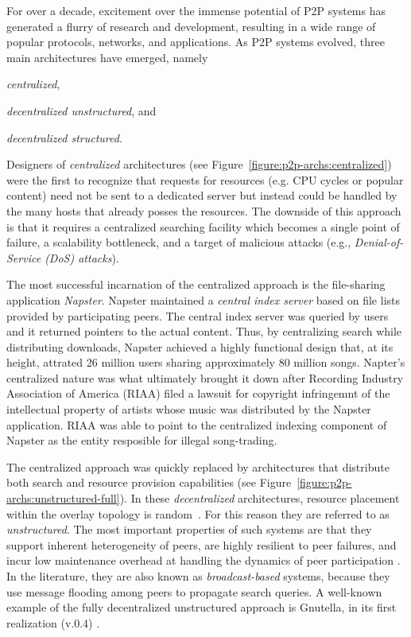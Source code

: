 For over a decade, excitement over the immense potential of P2P systems has
generated a flurry of research and development, resulting in a wide range of
popular protocols, networks, and applications. As P2P systems evolved, three
main architectures have emerged, namely
\begin{inparaenum}
  \item \emph{centralized},
  \item \emph{decentralized unstructured}, and
  \item \emph{decentralized structured}.
\end{inparaenum}

Designers of \emph{centralized} architectures (see
Figure~\ref{figure:p2p-archs:centralized}) were the first to recognize that
requests for resources (e.g. CPU cycles or popular content) need not be sent to
a dedicated server but instead could be handled by the many hosts that already
posses the resources. The downside of this approach is that it requires a
centralized searching facility which becomes a single point of failure, a
scalability bottleneck, and a target of malicious attacks (e.g.,
\emph{Denial-of-Service (DoS) attacks}).

The most successful incarnation of the centralized approach is the file-sharing
application \emph{Napster}\cite{napster}. Napster maintained a \emph{central
index server} based on file lists provided by participating peers. The central
index server was queried by users and it returned pointers to the actual
content. Thus, by centralizing search while distributing downloads,  Napster
achieved a highly functional design that, at its height, attrated 26 million
users sharing approximately 80 million songs\cite{jmm_naptopusage_2001}.
Napter's  centralized nature was what ultimately brought it down after Recording
Industry Association of America (RIAA) filed a lawsuit for copyright infringemnt
of the intellectual property of artists whose music was distributed by the
Napster application. RIAA was able to point to the centralized indexing
component of Napster as the entity resposible for illegal song-trading.
                                       
The centralized approach was quickly replaced by architectures that distribute
both search and resource provision capabilities (see
Figure~\ref{figure:p2p-archs:unstructured-full}). In these \emph{decentralized}
architectures, resource placement within the overlay topology is
random~\cite{YG-M2002}. For this reason they are referred to as
\emph{unstructured}. The most important properties of such systems are that they
support inherent heterogeneity of peers, are highly resilient to peer failures,
and incur low maintenance overhead at handling the dynamics of peer
participation \cite{stutzbach_churn_2006}. In the literature, they are also
known as \emph{broadcast-based} systems, because they use message flooding among
peers to propagate search queries. A well-known example of the fully
decentralized
unstructured approach is Gnutella, in its first realization (v.0.4)
\cite{gnutellav04}.

